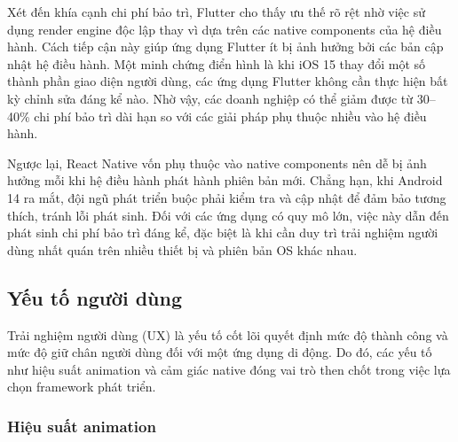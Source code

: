 \begin{flushleft}
    \hspace*{0.8cm}Xét đến khía cạnh chi phí bảo trì, Flutter cho thấy ưu thế rõ rệt nhờ việc sử dụng render engine độc lập thay vì dựa trên các native components của hệ điều hành. Cách tiếp cận này giúp ứng dụng Flutter ít bị ảnh hưởng bởi các bản cập nhật hệ điều hành. Một minh chứng điển hình là khi iOS 15 thay đổi một số thành phần giao diện người dùng, các ứng dụng Flutter không cần thực hiện bất kỳ chỉnh sửa đáng kể nào. Nhờ vậy, các doanh nghiệp có thể giảm được từ 30–40\% chi phí bảo trì dài hạn so với các giải pháp phụ thuộc nhiều vào hệ điều hành.

    \vspace{0.5em}

    \hspace*{1.5em}Ngược lại, React Native vốn phụ thuộc vào native components nên dễ bị ảnh hưởng mỗi khi hệ điều hành phát hành phiên bản mới. Chẳng hạn, khi Android 14 ra mắt, đội ngũ phát triển buộc phải kiểm tra và cập nhật để đảm bảo tương thích, tránh lỗi phát sinh. Đối với các ứng dụng có quy mô lớn, việc này dẫn đến phát sinh chi phí bảo trì đáng kể, đặc biệt là khi cần duy trì trải nghiệm người dùng nhất quán trên nhiều thiết bị và phiên bản OS khác nhau.
\end{flushleft}

\subsection{Yếu tố người dùng}

\begin{flushleft}
    \hspace*{0.8cm}Trải nghiệm người dùng (UX) là yếu tố cốt lõi quyết định mức độ thành công và mức độ giữ chân người dùng đối với một ứng dụng di động. Do đó, các yếu tố như hiệu suất animation và cảm giác native đóng vai trò then chốt trong việc lựa chọn framework phát triển.
\end{flushleft}

\subsubsection{Hiệu suất animation}

